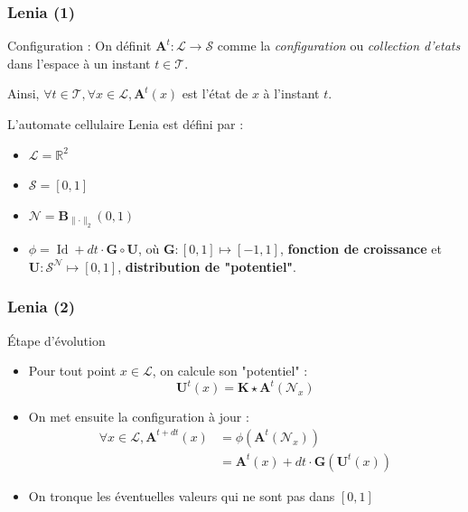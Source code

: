 \documentclass[aspectratio=43]{beamer}
\begin{document}
\begin{frame}
	\frametitle{Lenia (1)}

	\begin{block}{Configuration :}
		On définit $\mathbf{A}^t : \mathcal{L} \rightarrow \mathcal{S}$ comme la \textit{configuration}
		ou \textit{collection d'etats} dans l'espace à un instant $t \in \mathcal{T}$.

		Ainsi, $ \forall t \in \mathcal{T}, \forall x \in \mathcal{L}, \mathbf{A}^t(x)$ est l'état de $x$
		à l'instant $t$.
	\end{block}
	
	L'automate cellulaire Lenia est d\'efini par :
	\begin{itemize}
		\item $\mathcal{L} = \mathbb{R}^2$
		\item $\mathcal{S} = [0, 1]$
		\item $\mathcal{N} = \mathbf{B}_{\lVert \cdot \rVert_2}(0, 1)$
		\item $\phi = \operatorname{Id} + dt \cdot \mathbf{G} \circ \mathbf{U}$, o\`u  $\mathbf{G} : [0, 1] \mapsto [-1, 1] $, \textbf{fonction de croissance} et $\mathbf{U} : \mathcal{S}^\mathcal{N} \mapsto [0, 1]$, \textbf{distribution de "potentiel"}.
	\end{itemize}
\end{frame}

\begin{frame}
	\frametitle{Lenia (2)}

	\begin{alertblock}{\'Etape d'\'evolution}
		\begin{itemize}
			\item Pour tout point $x \in \mathcal{L}$, on calcule son "potentiel" : $$\mathbf{U}^t(x) = \mathbf{K} \star \mathbf{A}^t(\mathcal{N}_x)$$
			\item On met ensuite la configuration à jour :
				\begin{align*}
					\forall x \in \mathcal{L}, \mathbf{A}^{t + dt}(x) &= \phi(\mathbf{A}^{t}(\mathcal{N}_x)) \\
					&= \mathbf{A}^t(x) + dt \cdot \mathbf{G}(\mathbf{U}^t(x))
				\end{align*}
			\item On tronque les \'eventuelles valeurs qui ne sont pas dans $[0, 1]$
		\end{itemize}
	\end{alertblock}
\end{frame}
\end{document}
